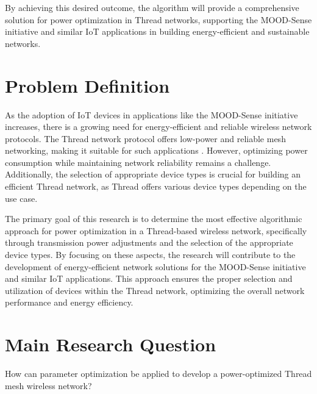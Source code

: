 By achieving this desired outcome, the algorithm will provide a comprehensive solution for power optimization in Thread networks, supporting the MOOD-Sense initiative and similar IoT applications in building energy-efficient and sustainable networks.


\section{Problem Definition}\label{sec:problem_definition}
As the adoption of \gls{IoT} devices in applications like the MOOD-Sense initiative increases, there is a growing need for energy-efficient and reliable wireless network protocols. The Thread network protocol offers low-power and reliable mesh networking, making it suitable for such applications \cite{Thread_Group_Fundamentals}. However, optimizing power consumption while maintaining network reliability remains a challenge. Additionally, the selection of appropriate device types is crucial for building an efficient Thread network, as Thread offers various device types depending on the use case.

The primary goal of this research is to determine the most effective algorithmic approach for power optimization in a Thread-based wireless network, specifically through transmission power adjustments and the selection of the appropriate device types. By focusing on these aspects, the research will contribute to the development of energy-efficient network solutions for the MOOD-Sense initiative and similar \gls{IoT} applications. This approach ensures the proper selection and utilization of devices within the Thread network, optimizing the overall network performance and energy efficiency.


\section{Main Research Question}
How can parameter optimization be applied to develop a power-optimized Thread mesh wireless network?


